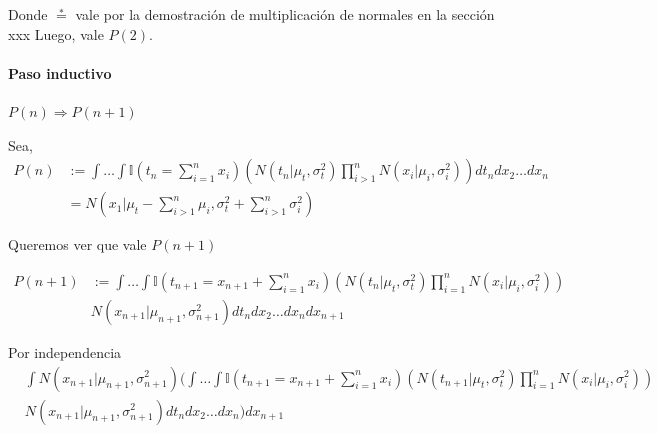 \documentclass[11pt,twoside,spanish]{report} %
\begin{document}
Donde $\overset{*}{=}$ vale por la demostraci\'on de multiplicaci\'on de normales en la secci\'on xxx%
Luego, vale $P(2)$.


\paragraph{Paso inductivo} $P(n) \Rightarrow P(n+1)$

Sea,
\begin{equation}
	\begin{split}
		P(n) &:=\int \dots \int \mathbb{I}(t_n= \sum_{i=1}^n x_i ) \left( N(t_n|\mu_t,\sigma_t^2)\prod_{i>1}^n N(x_i|\mu_i,\sigma_i^2) \right)  dt_ndx_2 \dots dx_n\\ &=N\left(x_1|\mu_t-\sum_{i>1}^n \mu_i,\sigma_t^2+\sum_{i>1}^n\sigma_i^2\right)
	\end{split}
\end{equation}

Queremos ver que vale $P(n+1)$

\begin{equation}
	\begin{split}
		P(n+1) &:= \int \dots \int \mathbb{I}(t_{n+1}=  x_{n+1} + \sum_{i=1}^{n} x_i ) \left(N(t_n|\mu_t,\sigma_t^2) \prod_{i=1}^{n} N(x_i|\mu_i,\sigma_i^2) \right)\\
		& N(x_{n+1}|\mu_{n+1},\sigma_{n+1}^2) dt_ndx_2 \dots dx_{n} dx_{n+1}
	\end{split}
\end{equation}

Por independencia
\begin{equation}
	\begin{split}
		&\int N(x_{n+1}|\mu_{n+1},\sigma_{n+1}^2)\Big( \int \dots \int \mathbb{I}(t_{n+1}=  x_{n+1} + \sum_{i=1}^{n} x_i ) \left(N(t_{n+1}|\mu_t,\sigma_t^2) \prod_{i=1}^{n} N(x_i|\mu_i,\sigma_i^2) \right)\\
		& N(x_{n+1}|\mu_{n+1},\sigma_{n+1}^2) dt_ndx_2 \dots dx_{n} \Big) dx_{n+1}
	\end{split}
\end{equation}
\end{document}
